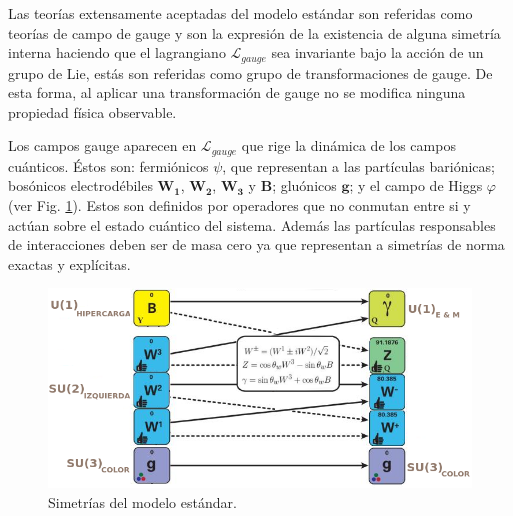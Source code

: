 
Las teorías extensamente aceptadas del modelo estándar son referidas como teorías de campo de gauge y son la expresión de la existencia de alguna simetría interna haciendo que el lagrangiano $\mathcal{L}_{gauge}$ sea invariante bajo la acción de un grupo de Lie, estás son referidas como grupo de transformaciones de gauge. De esta forma, al aplicar una transformación de gauge no se modifica ninguna propiedad física observable.

Los campos gauge aparecen en $\mathcal{L}_{gauge}$ que rige la dinámica de los campos cuánticos. Éstos son: fermiónicos $\psi$, que representan a las partículas bariónicas; bosónicos electrodébiles $\mathbf{W_1}$, $\mathbf{W_2} $, $\mathbf{W_3}$ y $\mathbf{B}$; gluónicos $\mathbf{g}$; y el campo de Higgs $\varphi$ (ver Fig. \ref{simetrias}). Estos son definidos por operadores que no conmutan entre si y actúan sobre el estado cuántico del sistema. Además las partículas responsables de interacciones deben ser de masa cero ya que representan a simetrías de norma exactas y explícitas.
 
\begin{figure}[!t]
\centering
\includegraphics[width=1\textwidth]{Fisica_de_Particulas/imagenes/simetria0.png}
\caption[Simetrías del modelo estándar]{Simetrías del modelo estándar.\footnotemark}
\label{simetrias}
\end{figure}


